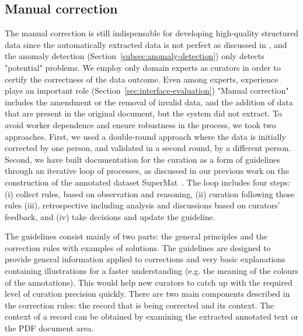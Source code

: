 \documentclass[a4paper]{article}
\begin{document}
\subsection{Manual correction}
\label{subsec:manual_correction}
The manual correction is still indispensable for developing high-quality structured data since the automatically extracted data is not perfect as discussed in \cite{lfoppiano2023automatic}, and the anomaly detection (Section~\ref{subsec:anomaly-detection}) only detects "potential" problems. 
We employ only domain experts as curators in order to certify the correctness of the data outcome. Even among experts, experience plays an important role (Section~\ref{sec:interface-evaluation})
"Manual correction" includes the amendment or the removal of invalid data, and the addition of data that are present in the original document, but the system did not extract. 
To avoid worker dependence and ensure robustness in the process, we took two approaches. 
First, we used a double-round approach where the data is initially corrected by one person, and validated in a second round, by a different person. 
Second, we have built documentation for the curation as a form of guidelines through an iterative loop of processes, as discussed in our previous work on the construction of the annotated dataset SuperMat~\cite{foppiano2021supermat}. 
The loop includes four steps: (i) collect rules, based on observation and reasoning, (ii) curation following those rules (iii), retrospective including analysis and discussions based on curators' feedback, and (iv) take decisions and update the guideline.

The guidelines consist mainly of two parts: the general principles and the correction rules with examples of solutions.
The guidelines are designed to provide general information applied to corrections and very basic explanations containing illustrations for a faster understanding (e.g. the meaning of the colours of the annotations). This would help new curators to catch up with the required level of curation precision quickly. 
There are two main components described in the correction rules: the record that is being corrected and its context. 
The context of a record can be obtained by examining the extracted annotated text or the PDF document area.
\end{document}
